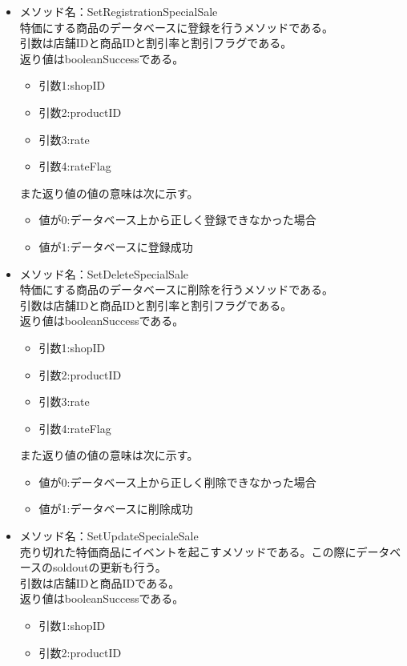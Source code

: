 \documentclass[a4j]{jarticle}
\begin{document}
\begin{itemize}
\item メソッド名：SetRegistrationSpecialSale\\

特価にする商品のデータベースに登録を行うメソッドである。\\
引数は店舗IDと商品IDと割引率と割引フラグである。\\
返り値はbooleanSuccessである。
	\begin{itemize}
		\item 引数1:shopID
		\item 引数2:productID
		\item 引数3:rate
		\item 引数4:rateFlag
	\end{itemize}
また返り値の値の意味は次に示す。
	\begin{itemize}
		\item 値が0:データベース上から正しく登録できなかった場合
		\item 値が1:データベースに登録成功
	\end{itemize}
%
\item メソッド名：SetDeleteSpecialSale\\

特価にする商品のデータベースに削除を行うメソッドである。\\
引数は店舗IDと商品IDと割引率と割引フラグである。\\
返り値はbooleanSuccessである。
	\begin{itemize}
		\item 引数1:shopID
		\item 引数2:productID
		\item 引数3:rate
		\item 引数4:rateFlag
	\end{itemize}
また返り値の値の意味は次に示す。
	\begin{itemize}
		\item 値が0:データベース上から正しく削除できなかった場合
		\item 値が1:データベースに削除成功
	\end{itemize}
%
\item メソッド名：SetUpdateSpecialeSale\\

売り切れた特価商品にイベントを起こすメソッドである。この際にデータベースのsoldoutの更新も行う。\\
引数は店舗IDと商品IDである。\\
返り値はbooleanSuccessである。
	\begin{itemize}
		\item 引数1:shopID
		\item 引数2:productID


\end{itemize}
\end{itemize}
\end{document}
